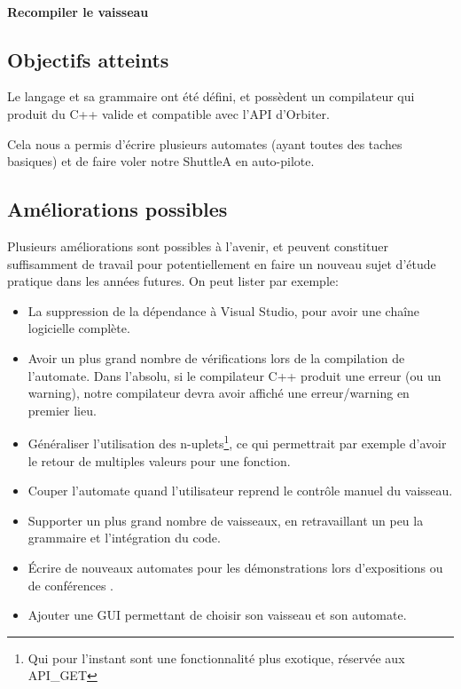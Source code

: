 \documentclass[a4paper,11pt]{article}
\begin{document}
        \paragraph{Recompiler le vaisseau}
            

    \subsection{Objectifs atteints}
        Le langage et sa grammaire ont été défini, et possèdent un compilateur qui produit du C++ valide et compatible avec l'API d'Orbiter.
        
        Cela nous a permis d'écrire plusieurs automates (ayant toutes des taches basiques) et de faire voler notre ShuttleA en auto-pilote.

    \subsection{Améliorations possibles}
        Plusieurs améliorations sont possibles à l'avenir, et peuvent constituer suffisamment de travail pour potentiellement en faire un nouveau sujet d'étude pratique dans les années futures.
        On peut lister par exemple:
        \begin{itemize}
            \item La suppression de la dépendance à Visual Studio, pour avoir une chaîne logicielle complète.
            \item Avoir un plus grand nombre de vérifications lors de la compilation de l'automate. Dans l'absolu, si le compilateur C++ produit une erreur (ou un warning), notre compilateur devra avoir affiché une erreur/warning en premier lieu.
            \item Généraliser l'utilisation des n-uplets\footnote{Qui pour l'instant sont une fonctionnalité plus exotique, réservée aux API\_GET}, ce qui permettrait par exemple d'avoir le retour de multiples valeurs pour une fonction.
            \item \og Couper \fg{} l'automate quand l'utilisateur reprend le contrôle manuel du vaisseau.
            \item Supporter un plus grand nombre de vaisseaux, en retravaillant un peu la grammaire et l'intégration du code.
            \item \'Ecrire de nouveaux automates pour les démonstrations lors d'expositions ou de conférences .
            \item Ajouter une GUI permettant de choisir son vaisseau et son automate.
        \end{itemize}
\end{document}
